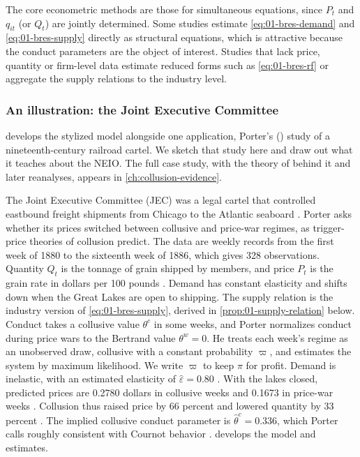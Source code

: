The core econometric methods are those for simultaneous equations, since $P_t$ and $q_{it}$ (or $Q_t$) are jointly
determined. Some studies estimate \eqref{eq:01-bres-demand} and \eqref{eq:01-bres-supply} directly as structural
equations, which is attractive because the conduct parameters are the object of interest. Studies that lack price,
quantity or firm-level data estimate reduced forms such as \eqref{eq:01-bres-rf} or aggregate the supply relations
to the industry level.

\subsubsection{An illustration: the Joint Executive Committee}\label{sec:01-porter-illustration}

\citet{Bresnahan1989} develops the stylized model alongside one application, Porter's (\citeyear{Porter1983}) study of
a nineteenth-century railroad cartel. We sketch that study here and draw out what it teaches about the NEIO. The full
case study, with the theory of \citet{GreenPorter1984} behind it and later reanalyses, appears in
\cref{ch:collusion-evidence}.

The Joint Executive Committee (JEC) was a legal cartel that controlled eastbound freight shipments from Chicago to the
Atlantic seaboard \citep[p.~302]{Porter1983}. Porter asks whether its prices switched between collusive and price-war
regimes, as trigger-price theories of collusion predict. The data are weekly records from the first week of 1880 to
the sixteenth week of 1886, which gives 328 observations. Quantity $Q_t$ is the tonnage of grain shipped by members,
and price $P_t$ is the grain rate in dollars per 100 pounds \citep[Table~2]{Porter1983}. Demand has constant
elasticity and shifts down when the Great Lakes are open to shipping. The supply relation is the industry version of
\eqref{eq:01-bres-supply}, derived in \cref{prop:01-supply-relation} below. Conduct takes a collusive value
$\theta^{c}$ in some weeks, and Porter normalizes conduct during price wars to the Bertrand value $\theta^{w} = 0$. He
treats each week's regime as an unobserved draw, collusive with a constant probability $\varpi$, and estimates the
system by maximum likelihood. We write $\varpi$ to keep $\pi$ for profit. Demand is inelastic, with an estimated
elasticity of $\hat\varepsilon = 0.80$ \citep[Table~3]{Porter1983}. With the lakes closed, predicted prices are 0.2780
dollars in collusive weeks and 0.1673 in price-war weeks \citep[Table~4]{Porter1983}. Collusion thus raised price by
66 percent and lowered quantity by 33 percent \citep[p.~310]{Porter1983}. The implied collusive conduct parameter is
$\hat\theta^{c} = 0.336$, which Porter calls roughly consistent with Cournot behavior \citep[p.~309]{Porter1983}.
 develops the model and estimates.

